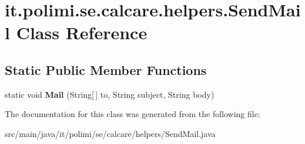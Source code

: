\hypertarget{classit_1_1polimi_1_1se_1_1calcare_1_1helpers_1_1SendMail}{}\section{it.\+polimi.\+se.\+calcare.\+helpers.\+Send\+Mail Class Reference}
\label{classit_1_1polimi_1_1se_1_1calcare_1_1helpers_1_1SendMail}
\subsection*{Static Public Member Functions}
\begin{DoxyCompactItemize}
\item 
\hypertarget{classit_1_1polimi_1_1se_1_1calcare_1_1helpers_1_1SendMail_af802832f1339614a60df99dbfaf70728}{}static void {\bfseries Mail} (String\mbox{[}$\,$\mbox{]} to, String subject, String body)\label{classit_1_1polimi_1_1se_1_1calcare_1_1helpers_1_1SendMail_af802832f1339614a60df99dbfaf70728}

\end{DoxyCompactItemize}


The documentation for this class was generated from the following file\+:\begin{DoxyCompactItemize}
\item 
src/main/java/it/polimi/se/calcare/helpers/Send\+Mail.\+java\end{DoxyCompactItemize}
